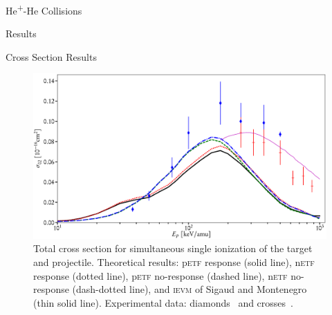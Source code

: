 \documentclass[letterpaper, 11 pt]{report}
\begin{document}
\begin{chapter}{\texorpdfstring{He\textsuperscript{+}}{He+}-He Collisions \label{chap:hephe}}
\begin{section}{Results \label{sec:hephe-disc}}
\begin{subsection}{Cross Section Results \label{sec:hephe-res}}
         \begin{figure}[t]
            \centering
            \includegraphics[width = \linewidth]{./images/hephe-cross/HepHe-102.eps}
            \caption[Total cross section for simultaneous single ionization of the target and projectile
                     in He\textsuperscript{+}-He collisions.]
                    {Total cross section for simultaneous single ionization of the target and
                     projectile.
                     Theoretical results: p\textsc{etf} response (solid line), n\textsc{etf} response
                                          (dotted line), p\textsc{etf} no-response (dashed line),
                                          n\textsc{etf} no-response (dash-dotted line), and
                                          \textsc{ievm} of Sigaud and Montenegro~\cite{SM-03} (thin
                                          solid line).
                     Experimental data: diamonds~\cite{Dub-89} and crosses~\cite{SSMSM-11}.
                     \label{fig:cs102}}
         \end{figure}


\end{subsection}
\end{section}
\end{chapter}
\end{document}
